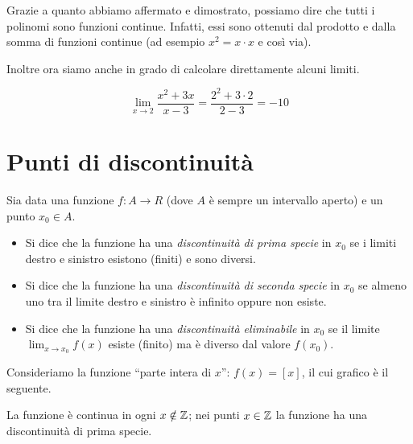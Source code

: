 \begin{remark}
Grazie a quanto abbiamo affermato e dimostrato, possiamo dire che tutti i polinomi sono funzioni continue. Infatti, essi sono ottenuti dal prodotto e dalla somma di funzioni continue (ad esempio $x^2 = x \cdot x$ e così via).
\end{remark}

Inoltre ora siamo anche in grado di calcolare direttamente alcuni limiti.
\begin{example}
\begin{equation*}
\lim_{x \to 2} \frac{x^2 + 3x}{x - 3} = \frac{2^2 + 3 \cdot 2}{2 - 3} = -10
\end{equation*}
\end{example}

\section{Punti di discontinuità}
Sia data una funzione $f: A \to R$ (dove $A$ è sempre un intervallo aperto) e un punto $x_0 \in A$.

\begin{itemize}
\item Si dice che la funzione ha una \emph{discontinuità di prima specie} in $x_0$ se i limiti destro e sinistro esistono (finiti) e sono diversi.
\item Si dice che la funzione ha una \emph{discontinuità di seconda specie} in $x_0$ se almeno uno tra il limite destro e sinistro è infinito oppure non esiste.
\item Si dice che la funzione ha una \emph{discontinuità eliminabile} in $x_0$ se il limite $\lim_{x \to x_0} f(x)$ esiste (finito) ma è diverso dal valore $f(x_0)$.
\end{itemize}

\begin{example}
Consideriamo la funzione ``parte intera di $x$'': $f(x) = [x]$, il cui grafico è il seguente.
\begin{center}
\end{center}
La funzione è continua in ogni $x \notin \mathbb Z$; nei punti $x \in \mathbb Z$ la funzione ha una discontinuità di prima specie.
\end{example}

